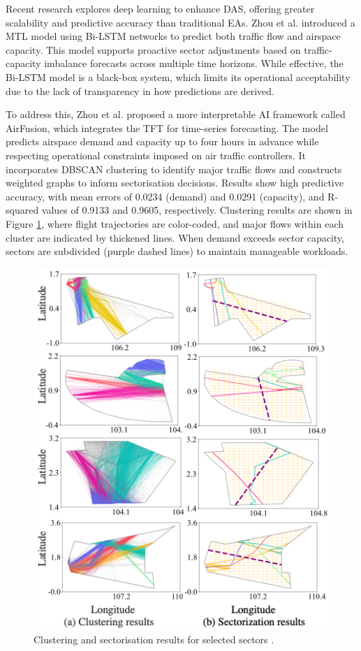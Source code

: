 Recent research explores deep learning to enhance \gls{DAS}, offering greater scalability and predictive accuracy than traditional \glspl{EA}.
Zhou et al. \cite{Zhou_2022} introduced a \gls{MTL} model using \gls{Bi-LSTM} networks to predict both traffic flow and airspace capacity. 
This model supports proactive sector adjustments based on traffic-capacity imbalance forecasts across multiple time horizons.
While effective, the \gls{Bi-LSTM} model is a black-box system, which limits its operational acceptability due to the lack of transparency in how predictions are derived.

To address this, Zhou et al. \cite{Zhou_2023} proposed a more interpretable \gls{AI} framework called AirFusion, which integrates the \gls{TFT} for time-series forecasting.
The model predicts airspace demand and capacity up to four hours in advance while respecting operational constraints imposed on air traffic controllers.
It incorporates \gls{DBSCAN} clustering to identify major traffic flows and constructs weighted graphs to inform sectorisation decisions.
Results show high predictive accuracy, with mean errors of 0.0234 (demand) and 0.0291 (capacity), and R-squared values of 0.9133 and 0.9605, respectively.
Clustering results are shown in Figure \ref{airspace-tft}, where flight trajectories are color-coded, and major flows within each cluster are indicated by thickened lines. 
When demand exceeds sector capacity, sectors are subdivided (purple dashed lines) to maintain manageable workloads.

\begin{figure}[!ht]
    \centering
    \includegraphics[width=.5\textwidth]{img/airspace-tft.png}
    \caption{Clustering and sectorisation results for selected sectors \cite{Zhou_2023}.}
    \label{airspace-tft}
\end{figure}

